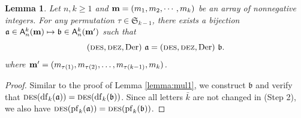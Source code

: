 \documentclass[12pt]{amsart}
\numberwithin{equation}{section}
\theoremstyle{plain}
\newtheorem{lemma}[theorem]{Lemma}
\theoremstyle{definition}
\newcommand\A{\mathsf{A}}
\def\Der{\mathrm{Der}}
\def\DES{\hbox{\rm\textsc{des}}}
\def\DEZ{\hbox{\rm\textsc{dez}}}
\def\S{\mathfrak{S}}
\def\a{\mathfrak{a}}
\def\b{\mathfrak{b}}
\def\df{\operatorname{df}}
\def\pf{\operatorname{pf}}
\def\neg#1{{{{\bar#1}}}}
\begin{document}
\begin{lemma}\label{lemma:mul2}
Let $n,k\geq1$ and 
${\bf m}=(m_1, m_2, \cdots, m_k)$ be an array of nonnegative integers.
	For any permutation $\tau\in \S_{k-1}$,
	there exists a bijection $\a\in \A_n^k({\bf m}) \mapsto \b\in \A_n^k({\bf m'})$ such that 
\begin{equation}
(\DES, \DEZ, \Der)~\a = (\DES, \DEZ, \Der)~\b.
\end{equation}
	where ${\bf m'} = (m_{\tau(1)}, m_{\tau(2)}, \ldots, m_{\tau(k-1)}, m_k)$.
\end{lemma}
\begin{proof}
	Similar to the proof of Lemma \ref{lemma:mul1}, we construct $\b$ and verify that $\DES(\df_k(\a))=\DES(\df_k(\b))$. 
	Since all letters $\neg k$ are not changed in (Step 2), we also have $\DES(\pf_k(\a))=\DES(\pf_k(\b))$.
\end{proof}
\end{document}
